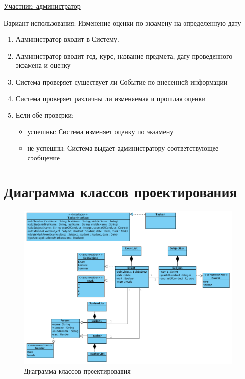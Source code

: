\documentclass[utf8x, 12pt]{G7-32}
\begin{document}
\bigskip

\underline{Участник: администратор}
  
Вариант использования: Изменение оценки по экзамену на определенную дату

\begin{enumerate}
	\item Администратор входит в Систему.
	\item Администратор вводит год, курс, название предмета, дату проведенного экзамена и оценку
	\item Система проверяет существует ли Событие по внесенной информации
	\item Система проверяет различны ли изменяемая и прошлая оценки
	\item Если обе проверки:
	\begin{itemize}
		\item успешны: Система изменяет оценку по экзамену
		\item не успешны: Система выдает администратору соответствующее сообщение
	\end{itemize}	
\end{enumerate}



\newpage
\section{Диаграмма классов проектирования}

\begin{figure}[hhh!]
	\begin{center}
		\includegraphics[width=15cm]{img/diag2}
	\end{center}
	\vspace{-5mm}\caption{Диаграмма классов проектирования}
\end{figure}
\end{document}
